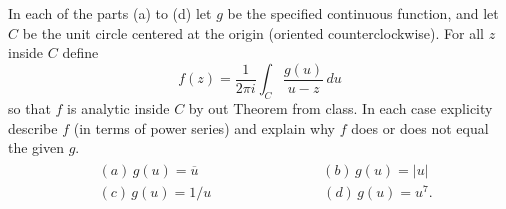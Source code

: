 \documentclass[10pt]{amsart}
\begin{document}
\begin{thm}
  \label{Ex2}
  In each of the parts (a) to (d) let $g$ be the specified continuous function, and let $C$ be the unit circle centered at the origin (oriented counterclockwise).
  For all $z$ inside $C$ define $$f(z) = \frac{1}{2\pi i}\int_C \frac{g(u)}{u-z}\,du$$
  so that $f$ is analytic inside $C$ by out Theorem from class.
  In each case explicity describe $f$ (in terms of power series) and explain why $f$ does or does not equal the given $g$.\\
  \begin{align*}
    \begin{split}
      &(a)\, g(u) = \overline{u} \qquad \qquad \qquad \qquad \,\,\,\,\,(b)\, g(u) = | u |\\
      &(c)\, g(u) = 1/u \qquad \qquad \qquad \qquad (d)\, g(u) = u^7.
    \end{split}
  \end{align*}
  

\end{thm}
\end{document}
